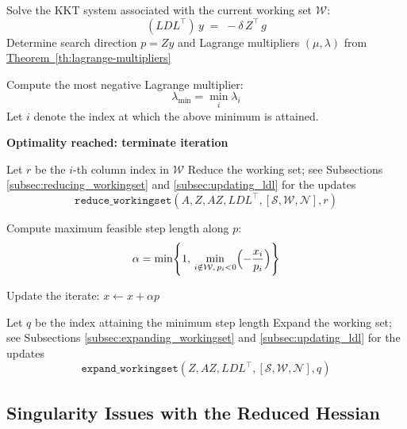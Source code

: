 \documentclass{book}
\theoremstyle{definition}
\newcommand{\thref}[1]{\hyperref[#1]{Theorem~\ref*{#1}}}
\newcounter{algorithm_}
\numberwithin{algorithm_}{chapter}
\newcommand{\alglabel}[1]{%
  \refstepcounter{algorithm_}%
  \label{#1}%
}
\begin{document}
{\begin{tcolorbox}[colback=gray!10!white, colframe=gray!80!black,
                  title=Algorithm 4.3: Active Set Method with Efficient Working Set Updates, sharp corners, boxrule=0.8pt]
{\begin{algorithmic}[1]
\Repeat

    \State Solve the KKT system associated with the current working set $\mathcal{W}$:
    \[
        (L D L^\top) \, y \; = \; - \delta \, Z^\top \, g
    \]
    \State Determine search direction $p = Z y$ and Lagrange multipliers $(\mu, \lambda)$ from \thref{th:lagrange-multipliers}


        \State Compute the most negative Lagrange multiplier:
			\[
				\lambda_{\min} = \min_i \lambda_i
			\]
		\State Let \(i\) denote the index at which the above minimum is attained.

    	\If{$\lambda_{\min} > -\varepsilon$}
       	 	\State \textbf{Optimality reached: terminate iteration}
    	\EndIf

        \State Let $r$ be the $i$-th column index in $\mathcal{W}$
        \State Reduce the working set; see Subsections \ref{subsec:reducing_workingset} and \ref{subsec:updating_ldl} for the updates
        \[
        	\texttt{reduce\_workingset}(A, Z, AZ, LDL^\top, [\mathcal{S}, \mathcal{W}, \mathcal{N}], r)
        \]
        

    \Else
		\State Compute maximum feasible step length along $p$:
		\[
    		\alpha = \min \Biggl\{ 
        		1, \, 
        		\min_{i \notin \mathcal{W}, \, p_i < 0} 
        		\Bigl( - \frac{x_i}{p_i} \Bigr) 
    		\Biggr\}
		\]
		
		\State Update the iterate: $x \gets x + \alpha p$
		
		

   			\State Let $q$ be the index attaining the minimum step length
			\State Expand the working set; see Subsections \ref{subsec:expanding_workingset} and \ref{subsec:updating_ldl} for the updates 
		\[ 
		    \texttt{expand\_workingset}(Z, AZ, LDL^\top, [\mathcal{S}, \mathcal{W}, \mathcal{N}], q) 
		\]
		\EndIf

    \EndIf


\end{algorithmic}
}
\alglabel{alg:qpas_updates}
\end{tcolorbox}


\newpage


\subsection{Singularity Issues with the Reduced Hessian}
\label{subsec:singularity}

}
\end{document}
